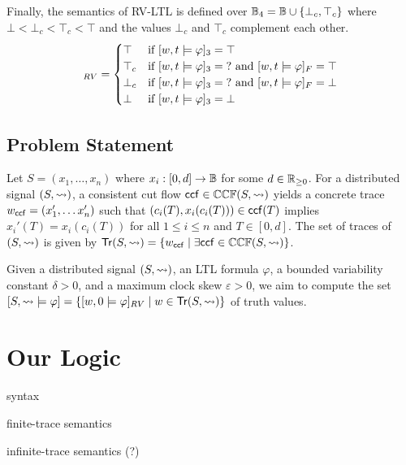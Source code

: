 Finally, the semantics of RV-LTL is defined over $\mathbb{B}_4 = \mathbb{B} \cup \{\bot_c, \top_c \}$ where $\bot < \bot_c < \top_c < \top$ and the values $\bot_c$ and $\top_c$ complement each other.
\begin{align*}
	[w,t \models \varphi]_{RV} &= \begin{cases}
		\top &\text{if } [w,t \models \varphi]_3 = \top \\
		\top_c &\text{if } [w,t \models \varphi]_3 = \? \text{ and } [w,t \models \varphi]_F = \top \\
		\bot_c &\text{if } [w,t \models \varphi]_3 = \? \text{ and } [w,t \models \varphi]_F = \bot \\
		\bot &\text{if } [w,t \models \varphi]_3 = \bot \\
	\end{cases} \\
\end{align*}	

\subsection{Problem Statement}

Let $S = (x_1, \ldots, x_n)$ where $x_i : [0,d] \to \mathbb{B}$ for some $d \in \mathbb{R}_{\geq 0}$.
For a distributed signal $(S,{\rightsquigarrow})$, a consistent cut flow $\mathsf{ccf} \in \mathbb{CCF}(S,{\rightsquigarrow})$ yields a concrete trace $w_{\mathsf{ccf}} = (x'_1, \ldots x'_n)$ such that $(c_i(T), x_i(c_i(T))) \in \mathsf{ccf}(T)$ implies $x_i'(T) = x_i(c_i(T))$ for all $1 \leq i \leq n$ and $T \in [0,d]$.
The set of traces of $(S,{\rightsquigarrow})$ is given by $\tr(S,{\hb}) = \{ w_\ccf \st \exists \ccf \in \mathbb{CCF}(S,{\hb})\}$.




Given a distributed signal $(S, {\rightsquigarrow})$, an LTL formula $\varphi$, a bounded variability constant $\delta > 0$, and a maximum clock skew $\varepsilon > 0$, we aim to compute the set $[S, {\hb} \models \varphi] = \{ [w, 0 \models \varphi]_{RV} \st w \in \tr(S, {\hb}) \}$ of truth values.

\begin{example}
	\TODO
\end{example}

\section{Our Logic}
syntax

finite-trace semantics

infinite-trace semantics (?)